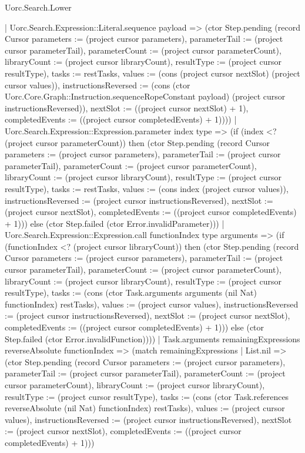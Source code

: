 \begin{lexlean}{Uorc.Search.Lower}
\begin{semanticmodule}
{            | Uorc.Search.Expression::Literal.sequence payload => (ctor Step.pending (record Cursor {parameters := (project cursor parameters), parameterTail := (project cursor parameterTail), parameterCount := (project cursor parameterCount), libraryCount := (project cursor libraryCount), resultType := (project cursor resultType), tasks := restTasks, values := (cons (project cursor nextSlot) (project cursor values)), instructionsReversed := (cons (ctor Uorc.Core.Graph::Instruction.sequenceRopeConstant payload) (project cursor instructionsReversed)), nextSlot := ((project cursor nextSlot) + 1), completedEvents := ((project cursor completedEvents) + 1)})))
          | Uorc.Search.Expression::Expression.parameter index type => (if (index <? (project cursor parameterCount)) then (ctor Step.pending (record Cursor {parameters := (project cursor parameters), parameterTail := (project cursor parameterTail), parameterCount := (project cursor parameterCount), libraryCount := (project cursor libraryCount), resultType := (project cursor resultType), tasks := restTasks, values := (cons index (project cursor values)), instructionsReversed := (project cursor instructionsReversed), nextSlot := (project cursor nextSlot), completedEvents := ((project cursor completedEvents) + 1)})) else (ctor Step.failed (ctor Error.invalidParameter)))
          | Uorc.Search.Expression::Expression.call functionIndex type arguments => (if (functionIndex <? (project cursor libraryCount)) then (ctor Step.pending (record Cursor {parameters := (project cursor parameters), parameterTail := (project cursor parameterTail), parameterCount := (project cursor parameterCount), libraryCount := (project cursor libraryCount), resultType := (project cursor resultType), tasks := (cons (ctor Task.arguments arguments (nil Nat) functionIndex) restTasks), values := (project cursor values), instructionsReversed := (project cursor instructionsReversed), nextSlot := (project cursor nextSlot), completedEvents := ((project cursor completedEvents) + 1)})) else (ctor Step.failed (ctor Error.invalidFunction))))
        | Task.arguments remainingExpressions reverseAbsolute functionIndex => (match remainingExpressions
          | List.nil => (ctor Step.pending (record Cursor {parameters := (project cursor parameters), parameterTail := (project cursor parameterTail), parameterCount := (project cursor parameterCount), libraryCount := (project cursor libraryCount), resultType := (project cursor resultType), tasks := (cons (ctor Task.references reverseAbsolute (nil Nat) functionIndex) restTasks), values := (project cursor values), instructionsReversed := (project cursor instructionsReversed), nextSlot := (project cursor nextSlot), completedEvents := ((project cursor completedEvents) + 1)}))
}
\end{semanticmodule}
\end{lexlean}
